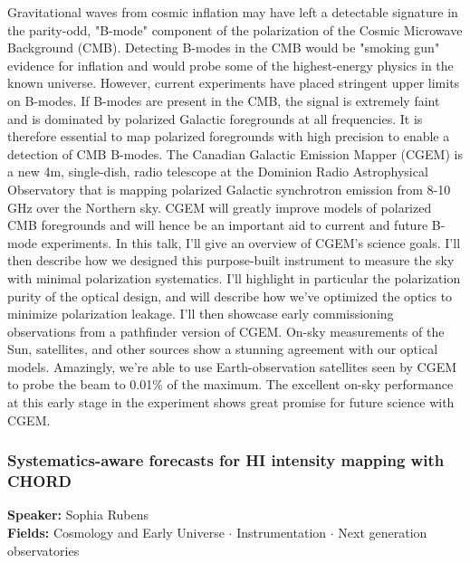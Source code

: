 Gravitational waves from cosmic inflation may have left a detectable signature in the parity-odd, "B-mode" component of the polarization of the Cosmic Microwave Background (CMB). Detecting B-modes in the CMB would be "smoking gun" evidence for inflation and would probe some of the highest-energy physics in the known universe. However, current experiments have placed stringent upper limits on B-modes. If B-modes are present in the CMB, the signal is extremely faint and is dominated by polarized Galactic foregrounds at all frequencies. It is therefore essential to map polarized foregrounds with high precision to enable a detection of CMB B-modes. The Canadian Galactic Emission Mapper (CGEM) is a new 4m, single-dish, radio telescope at the Dominion Radio Astrophysical Observatory that is mapping polarized Galactic synchrotron emission from 8-10 GHz over the Northern sky. CGEM will greatly improve models of polarized CMB foregrounds and will hence be an important aid to current and future B-mode experiments. In this talk, I'll give an overview of CGEM's science goals. I'll then describe how we designed this purpose-built instrument to measure the sky with minimal polarization systematics. I'll highlight in particular the polarization purity of the optical design, and will describe how we've optimized the optics to minimize polarization leakage. I'll then showcase early commissioning observations from a pathfinder version of CGEM. On-sky measurements of the Sun, satellites, and other sources show a stunning agreement with our optical models. Amazingly, we're able to use Earth-observation satellites seen by CGEM to probe the beam to 0.01\% of the maximum. The excellent on-sky performance at this early stage in the experiment shows great promise for future science with CGEM.

\hypertarget{abstract-talk-43}{}\label{abstract-page-talk-43}
\subsubsection*{Systematics-aware forecasts for HI intensity mapping with CHORD}
\textbf{Speaker:} Sophia Rubens\\
\textbf{Fields:} Cosmology and Early Universe $\cdot$ Instrumentation $\cdot$ Next generation observatories


